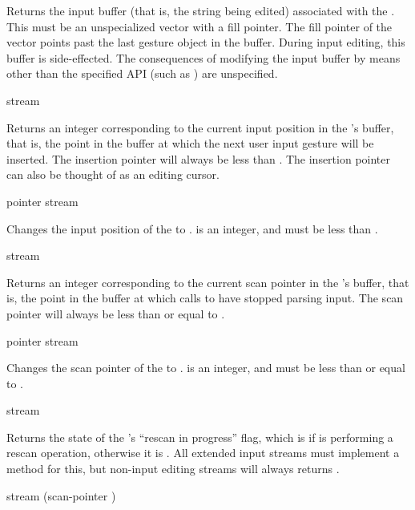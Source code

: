 Returns the input buffer (that is, the string being edited) associated with the
 .  This must be an unspecialized vector
with a fill pointer.  The fill pointer of the vector points past the last gesture
object in the buffer.  During input editing, this buffer is side-effected.  The
consequences of modifying the input buffer by means other than the specified API
(such as ) are unspecified.

 {stream}

Returns an integer corresponding to the current input position in the
 's buffer, that is, the point in the
buffer at which the next user input gesture will be inserted.  The insertion
pointer will always be less than .  The insertion pointer can also be thought of as an editing
cursor.

 {pointer stream}

Changes the input position of the   to
.   is an integer, and must be less than
.

 {stream}

Returns an integer corresponding to the current scan pointer in the  's buffer, that is, the point in the buffer at which
calls to  have stopped parsing input.  The scan pointer will always
be less than or equal to .

 {pointer stream}

Changes the scan pointer of the   to
.   is an integer, and must be less than or equal to
.


 {stream}

Returns the state of the  's ``rescan in
progress'' flag, which is  if  is performing a rescan
operation, otherwise it is .  All extended input streams must
implement a method for this, but non-input editing streams will always returns
.

 {stream \optional (scan-pointer )}

